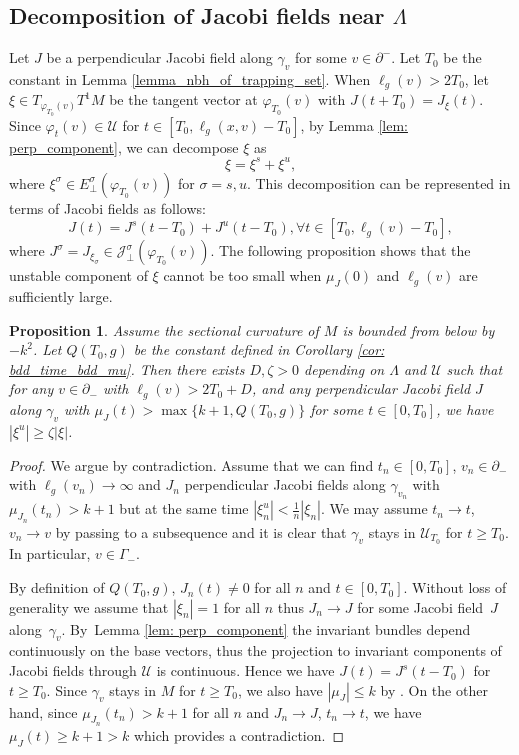\documentclass[JEP,XML,SOM,Unicode,NoFloatCountersInSection]{cedram}
\newcommand{\elg}{\ell_g}
\newtheorem{proposition}[theorem]{Proposition}
\theoremstyle{definition}
\let\phi\varphi
\renewcommand{\>}{{\rangle}}
\newcommand{\<}{{\langle}}
\begin{document}
\subsection{Decomposition of Jacobi fields near \texorpdfstring{$\Lambda$}{La}}

Let $J$ be a perpendicular Jacobi field along $\gamma_v$ for some $v\in\partial^-$. Let $T_0$ be the constant in Lemma \ref{lemma_nbh_of_trapping_set}. When $\elg(v)>2T_0$, let $\xi\in T_{\phi_{T_0}(v)}T^1M$ be the tangent vector at $\phi_{T_0}(v)$ with $J(t+T_0)=J_{\xi}(t)$. Since $\phi_{t}(v)\in \mathcal U$ for $t\in [T_0, \elg(x,v)-T_0]$, by Lemma \ref{lem: perp_component}, we can decompose $\xi$ as
\[
\xi=\xi^s+\xi^u,
\]
where $\xi^{\sigma}\in E^{\sigma}_{\perp}(\phi_{T_0}(v))$ for $\sigma= s,u$.
This decomposition can be represented in terms of Jacobi fields as follows:
\[
J(t)=J^s(t-T_0)+J^u(t-T_0), \forall t\in [T_0, \elg(v)-T_0],
\]
where $J^{\sigma}=J_{\xi_{\sigma}}\in \mathcal{J}^{\sigma}_{\perp}(\phi_{T_0}(v))$. The following proposition shows that the unstable component of $\xi$ cannot be too small when $\mu_J(0)$ and $\elg(v)$ are sufficiently large.

\begin{proposition}\label{prop: big_unstable_comp}
Assume the sectional curvature of $M$ is bounded from below by $-k^2$. Let $Q(T_0,g)$ be the constant defined in Corollary \ref{cor: bdd_time_bdd_mu}. Then there exists $D, \zeta>0$ depending on $\Lambda$ and $\mathcal{U}$ such that for any $v\in\partial_-$ with $\elg(v)>2T_0+D$, and any perpendicular Jacobi field $J$ along $\gamma_v$ with $\mu_J(t)>\max\{k+1, Q(T_0,g)\}$ for some $t\in[0,T_0]$, we have $|\xi^u|\geq \zeta |\xi|$.
\end{proposition}

\begin{proof}
We argue by contradiction. Assume that we can find $t_n\in[0,T_0]$, $v_n\in\partial_-$ with $\elg(v_n)\to\infty$ and $J_n$ perpendicular Jacobi fields along $\gamma_{v_n}$ with $\mu_{J_n}(t_n)>k+1$ but at the same time $|\xi^u_n|<\frac{1}{n} |\xi_n|$. We may assume $t_n\to t$, $v_n\to v$ by passing to a subsequence and it is clear that $\gamma_v$ stays in $\mathcal{U}_{T_0}$ for $t\geq T_0$. In particular, $v\in \Gamma_-$.

By definition of $Q(T_0,g)$, $J_n(t)\neq 0$ for all $n$ and $t\in[0,T_0]$. Without loss of generality we assume that $|\xi_n|=1$ for all $n$ thus $J_n\to J$ for some Jacobi field~$J$ along~$\gamma_v$. By~Lemma \ref{lem: perp_component} the invariant bundles depend continuously on the base vectors, thus the projection to invariant components of Jacobi fields through $\mathcal U$ is continuous. Hence we have $J(t)=J^s(t-T_0)$ for $t\geq T_0$. Since $\gamma_v$ stays in $M$ for $t\geq T_0$, we also have $|\mu_J|\leq k$ by \cite[Prop.\,2.11]{E73}. On the other hand, since $\mu_{J_n}(t_n)>k+1$ for all $n$ and $J_n\to J$, $t_n\to t$, we have $\mu_{J}(t)\geq k+1>k$ which provides a contradiction.
\end{proof}
\end{document}
